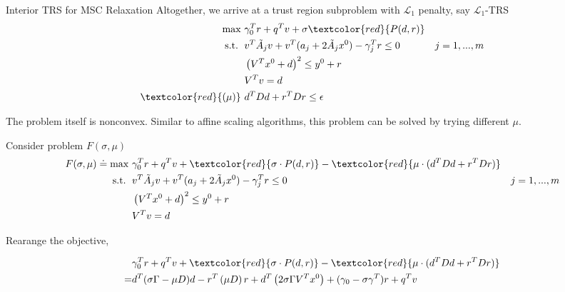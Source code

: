 \documentclass{beamerswitch}
\newcommand{\st}{\mathrm{s.t.\;}}
\newcommand{\red}[1]{\textcolor{red}{#1}}
\begin{document}
\begin{frame}[allowframebreaks]{Interior TRS for MSC Relaxation}
  Altogether, we arrive at a trust region subproblem with \(\mathcal L_1\) penalty, say \(\mathcal L_1\)-TRS
  \begin{equation}\label{eq.msc.trs}
    \begin{aligned}
      \max ~        & \gamma_0^T r + q^Tv  + \sigma \red{P(d, r)}                                       \\
      \st  ~        & v^T\tilde A_j v + v^T (a_j + 2 \tilde A_jx^0) - \gamma_j^Tr \le 0 & j = 1, ..., m \\
                    & \left(V^Tx^0 + d\right)^2 \le y^0 + r                                             \\
                    & V^Tv = d                                                                          \\
      \red {(\mu)}~ & d^TDd + r^TDr \le \epsilon                                        &
    \end{aligned}
  \end{equation}

  The problem itself is nonconvex. Similar to affine scaling algorithms, this problem can be solved by trying different \(\mu\).

  \framebreak

  Consider problem \(F(\sigma, \mu)\)
  \begin{equation}\label{eq.msc.trs}
    \begin{aligned}
      F(\sigma, \mu)\doteq  \max ~ & \gamma_0^T r + q^Tv  + \red{\sigma \cdot P(d, r)}  -  \red{\mu \cdot( d^TDd + r^TDr )}               \\
      \st  ~                       & v^T\tilde A_j v + v^T (a_j + 2 \tilde A_jx^0) - \gamma_j^Tr \le 0                      & j=1, ..., m \\
                                   & \left(V^Tx^0 + d\right)^2 \le y^0 + r                                                                \\
                                   & V^Tv = d
    \end{aligned}
  \end{equation}

  Rearange the objective,

  \begin{align*}
      & \gamma_0^T r + q^Tv + \red{\sigma \cdot P(d, r)}  -  \red {\mu \cdot( d^TDd + r^TDr )}                                                  \\
    = & d^T (\sigma \Gamma - \mu D) d - r^T\left(\mu D\right)r +  d^T\left(2\sigma\Gamma V^T x^0 \right) + (\gamma_0 - \sigma\gamma^T )r + q^Tv
  \end{align*}


\end{frame}
\end{document}

